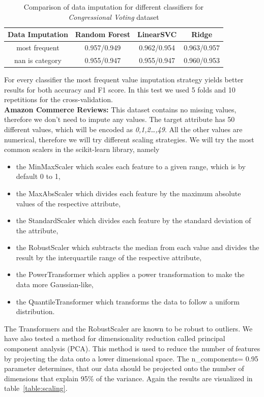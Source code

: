 \documentclass[a4paper,10pt]{article}
\begin{document}
\begin{table}[h!]
\centering
\begin{tabular}{|c|c|c|c|}
\hline
\textbf{Data Imputation} & \textbf{Random Forest} & \textbf{LinearSVC} & \textbf{Ridge} \\
\hline
\textsf{most frequent} & \cellcolor[HTML]{C1E1C1}0.957/0.949 & \cellcolor[HTML]{C1E1C1}0.962/0.954 & \cellcolor[HTML]{C1E1C1}0.963/0.957 \\
\hline
\textsf{nan is category} & 0.955/0.947 & 0.955/0.947 & 0.960/0.953 \\
\hline
\end{tabular}
\caption{Comparison of data imputation for different classifiers for \textit{Congressional Voting} dataset}
\label{table:imputation}
\end{table}
For every classifier the most frequent value imputation strategy yields better results for both accuracy and F1 score.
In this test we used 5 folds and 10 repetitions for the cross-validation.\\
\textbf{Amazon Commerce Reviews:} This dataset contains no missing values, therefore we don't need to impute any values.
The target attribute has 50 different values, which will be encoded as \textit{0,1,2\ldots,49}. 
All the other values are numerical, therefore we will try different scaling strategies.
We will try the most common scalers in the scikit-learn library, namely 
\begin{itemize}
    \item the MinMaxScaler which scales each feature to a given range, which is by default 0 to 1,
    \item the MaxAbsScaler which divides each feature by the maximum absolute values of the respective attribute,
    \item the StandardScaler which divides each feature by the standard deviation of the attribute,
    \item the RobustScaler which subtracts the median from each value and divides the result by the interquartile range of the respective attribute,
    \item the PowerTransformer which applies a power transformation to make the data more Gaussian-like,
    \item the QuantileTransformer which transforms the data to follow a uniform distribution.
\end{itemize}
The Transformers and the RobustScaler are known to be robust to outliers. We have also tested a method for dimensionality reduction called
principal component analysis (PCA). This method is used to reduce the number of features by projecting the data onto a lower dimensional space. 
The n\_components= 0.95 parameter determines, that our data should be projected onto the number of dimensions that explain 95\% of the variance.
Again the results are visualized in table~\ref{table:scaling}.
\end{document}
